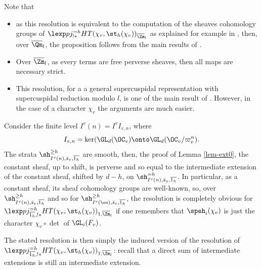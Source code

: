 Note that
\begin{itemize}
\item as this resolution is equivalent to the computation of the sheaves
cohomology groups
of $\lexp p j_{!*}^{=h} HT(\chi_v,\st_h(\chi_v))_{\overline \Zm_l} $
as explained for example in
\cite[Prop.\,B.1.5]{boyer-duke}, then,
over $\overline \Qm_l$, the proposition follows from the main results of \cite{boyer-invent2}.

\item Over $\overline \Zm_l$, as every terms are free perverse sheaves, then
all maps are necessary strict.

\item This resolution, for a a general supercuspidal representation
with supercuspidal reduction modulo $l$, is one of the main result
of \cite[\S2.3]{boyer-duke}. However, in the case of a character $\chi_v$ the arguments are much easier.
\end{itemize}

Consider the finite level $I^v(n)=I^v I_{v,n}$, where
\[
I_{v,n}=\ker (\GL_d(\OC_v) \onto
\GL_d(\OC_v/\varpi_v^n).
\]
The strata
$\sh^{\geq h}_{I^v(n),\bar s_v,\overline{1_h}}$ are smooth, then, \cf the proof of Lemma
\ref{lem-ext0}, the constant sheaf, up to shift, is perverse and
so equal to the intermediate extension of the constant sheaf, shifted by $d-h$,
on $\sh^{=h}_{I^v(n),\bar s_v,\overline{1_h}}$. In particular, as a constant sheaf,
its sheaf cohomology groups are well-known,
so, over $\sh^{\geq h}_{I^v(n),\bar s_v,\overline{1_h}}$ and so
for $\sh^{\geq h}_{I^v(\oo),\bar s_v,\overline{1_h}}$, the resolution is completely obvious for
$\lexp p j_{\overline{1_h},!*}^{=h} HT(\chi_v,\st_h(\chi_v))_{1,\overline \Zm_l}$
if one remembers that $\speh_i(\chi_v)$ is just the character $\chi_v \circ \det$
of $\GL_i(F_v)$.

The stated resolution is then simply the induced version of the resolution
of $\lexp p j^{=h}_{\overline{1_h},!*} HT(\chi_v,\st_h(\chi_v))_{1,\overline \Zm_l}$:
recall that a direct sum of intermediate extensions is still an intermediate
extension.

